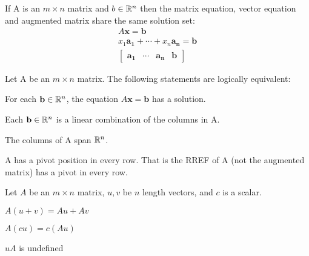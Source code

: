 \begin{card}
    \begin{theorem}[Notation]
        If A is an $m \times n$ matrix and $b \in \mathbb{R}^n$ then the
        matrix equation, vector equation and augmented matrix share the same
        solution set:
        \begin{align*}
        A\bm{x = b}
        \\
        x_1 \bm{a_1} + \cdots + x_n \bm{a_n = b}
        \\
        [ \begin{array}{ccc|c} \bm{a_1} & \cdots & \bm{a_n}
                             & \bm{b} \end{array} ]
        \end{align*}
    \end{theorem}

    \begin{theorem}
    Let A be an $m \times n$ matrix. The following statements are logically
    equivalent:
    \begin{compactenum}
    \item For each $\mathbf{b} \in \mathbb{R}^n$, the equation
        $A\bm{x = b}$ has a solution.
    \item Each $\mathbf{b} \in \mathbb{R}^n$ is a linear combination of the
        columns in A.
    \item The columns of A span $\mathbb{R}^n$.
    \item A has a pivot position in every row. That is the RREF of A (not the
    augmented matrix) has a pivot in every row.
    \end{compactenum}
    \end{theorem}

    \begin{theorem}
        Let $A$ be an $m \times n$ matrix, $u, v$ be $n$ length vectors,
        and $c$ is a scalar.
        \begin{compactenum}
        \item $A(u + v) = Au + Av$
        \item $A(cu) = c(Au)$
        \item $uA$ is undefined
        \end{compactenum}
    \end{theorem}

\end{card}



